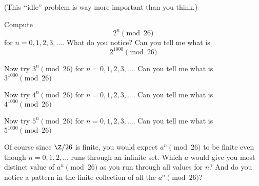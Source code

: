   (This \lq\lq idle'' problem is way more important than you think.)
  \begin{myenum}
  \item 
    Compute
    \[
      2^n \pmod{26}
    \]
    for $n = 0, 1, 2, 3, ...$.
    What do you notice?
    Can you tell me what is
    \[
      2^{1000} \pmod{26}
    \]
  \item
    Now try $3^n \pmod{26}$
    for $n = 0, 1, 2, 3, ...$.
    Can you tell me what is $3^{1000} \pmod{26}$
  \item  Now try
    $4^n \pmod{26}$
    for $n = 0, 1, 2, 3, ...$.
    Can you tell me what is
    $4^{1000} \pmod{26}$
  \item Now try
    $5^n \pmod{26}$
    for $n = 0, 1, 2, 3, ...$.
    Can you tell me what is
    $5^{1000} \pmod{26}$
  \item Of course since $\Z/26$ is finite, you would expect
    $a^n \pmod{26}$ to be finite even though $n=0,1,2,...$
    runs through an infinite set.
    Which $a$ would give you most distinct value
    of $a^n \pmod{26}$ as you
    run through all values for $n$?
    And do you notice a pattern in the finite collection of
    all the $a^n \pmod{26}$?
  \end{myenum}
